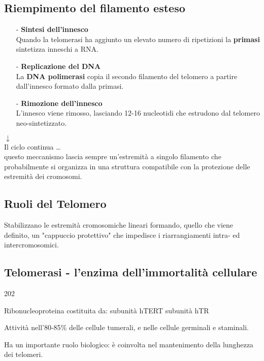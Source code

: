 \documentclass{article}
\begin{document}
\subsection{Riempimento del filamento esteso}
\begin{itemize}
    \item [-]\textbf{Sintesi dell'innesco}\\
    Quando la telomerasi ha aggiunto un elevato numero di ripetizioni la \textbf{primasi} sintetizza inneschi a RNA.
    \item [-]\textbf{Replicazione del DNA}\\
    La \textbf{DNA polimerasi} copia il secondo filamento del telomero a partire dall'innesco formato dalla primasi.
    \item [-]\textbf{Rimozione dell'innesco}\\
    L'innesco viene rimosso, lasciando 12-16 nucleotidi che estrudono dal telomero neo-sintetizzato.
\end{itemize}
$ \downarrow $\\
Il ciclo continua \dots\\
questo meccanismo lascia sempre un'estremità a singolo filamento che probabilmente si organizza in una struttura compatibile con la protezione delle estremità dei cromosomi.
\subsection{Ruoli del Telomero} Stabilizzano le estremità cromosomiche lineari formando, quello che viene definito, un "cappuccio protettivo" che impedisce i riarrangiamenti intra- ed intercromosomici.
\subsection{Telomerasi - l'enzima dell'immortalità cellulare} 
\begin{dingautolist}{202}
    \item Ribonucleoproteina costituita da:
    \subitem subunità hTERT
    \subitem subunità hTR
    \item  Attività nell'80-85$ \% $ delle cellule tumerali, e nelle cellule germinali e staminali.
    \item Ha un importante ruolo biologico: è coinvolta nel mantenimento della lunghezza dei telomeri.
    \end{dingautolist}
\end{document}
